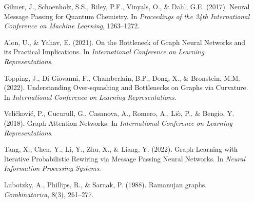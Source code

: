 \documentclass[11pt,a4paper]{article}
\begin{document}

\begin{thebibliography}{10}

Gilmer, J., Schoenholz, S.S., Riley, P.F., Vinyals, O., \& Dahl, G.E. (2017).
\newblock Neural Message Passing for Quantum Chemistry.
\newblock In \textit{Proceedings of the 34th International Conference on Machine Learning}, 1263--1272.

Alon, U., \& Yahav, E. (2021).
\newblock On the Bottleneck of Graph Neural Networks and its Practical Implications.
\newblock In \textit{International Conference on Learning Representations}.

Topping, J., Di Giovanni, F., Chamberlain, B.P., Dong, X., \& Bronstein, M.M. (2022).
\newblock Understanding Over-squashing and Bottlenecks on Graphs via Curvature.
\newblock In \textit{International Conference on Learning Representations}.

Veličković, P., Cucurull, G., Casanova, A., Romero, A., Liò, P., \& Bengio, Y. (2018).
\newblock Graph Attention Networks.
\newblock In \textit{International Conference on Learning Representations}.

Tang, X., Chen, Y., Li, Y., Zhu, X., \& Liang, Y. (2022).
\newblock Graph Learning with Iterative Probabilistic Rewiring via Message Passing Neural Networks.
\newblock In \textit{Neural Information Processing Systems}.

Lubotzky, A., Phillips, R., \& Sarnak, P. (1988).
\newblock Ramanujan graphs.
\newblock \textit{Combinatorica}, 8(3), 261--277.

\end{thebibliography}
\end{document}
